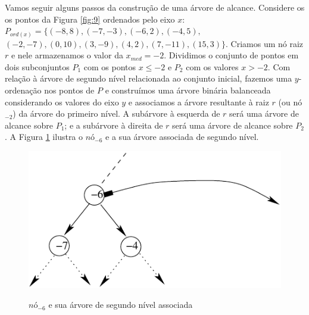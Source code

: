 Vamos seguir alguns passos da construção de uma árvore de alcance. Considere os os pontos da Figura \ref{fig:9} ordenados pelo eixo $x$: $P_{ord(x)} = \{(-8,8), (-7, -3), (-6, 2), (-4,5),$ $(-2,-7),(0,10), (3,-9), (4,2), (7,-11), (15,3)\}$. Criamos um nó raiz $r$ e nele armazenamos o valor da $x_{med} = -2$. Dividimos o conjunto de pontos em dois subconjuntos $P_1$ com os pontos $x\leq -2$ e $P_2$ com os valores $x > -2$.
Com relação à árvore de segundo nível relacionada ao conjunto inicial, fazemos uma $y$-ordenação nos pontos de $P$ e construímos uma árvore binária balanceada considerando os valores do eixo $y$ e associamos a árvore resultante à raiz $r$ (ou nó$_{-2}$) da árvore do primeiro nível. A subárvore à esquerda de $r$ será uma árvore de alcance sobre $P_1$; e a subárvore à direita de $r$ será uma árvore de alcance sobre $P_2$.
A Figura \ref{fig:10} ilustra o $nó_{-6}$ e a sua árvore associada de segundo nível.
\begin{figure}[h!]

\centering
\begin{minipage}{.5\textwidth}
  \centering
  \includegraphics[width=.8\linewidth]{images/range_tree3.pdf}

  \label{fig:test1}
\end{minipage}%
\begin{minipage}{.5\textwidth}
  \centering
  
  \label{fig:test2}
 
\end{minipage}
 \caption{$nó_{-6}$ e sua árvore de segundo nível associada}
 \label{fig:10}
\end{figure}

